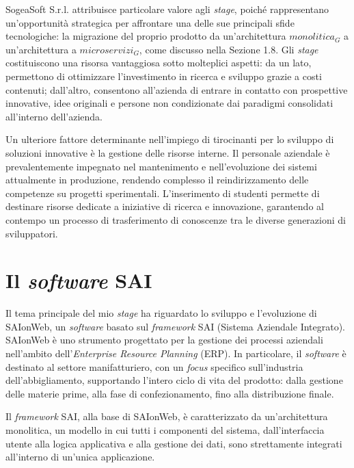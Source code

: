     \vspace{0.2 em}
    \noindent SogeaSoft S.r.l. attribuisce particolare valore agli \textit{stage}, poiché rappresentano un'opportunità strategica per affrontare una delle sue principali sfide tecnologiche: la migrazione del proprio prodotto da un’architettura $monolitica_G$ a un’architettura a $microservizi_G$, come discusso nella Sezione 1.8. Gli \textit{stage} costituiscono una risorsa vantaggiosa sotto molteplici aspetti: da un lato, permettono di ottimizzare l’investimento in ricerca e sviluppo grazie a costi contenuti; dall’altro, consentono all’azienda di entrare in contatto con prospettive innovative, idee originali e persone non condizionate dai paradigmi consolidati all'interno dell’azienda.  

    \vspace{0.2 em}
    \noindent Un ulteriore fattore determinante nell’impiego di tirocinanti per lo sviluppo di soluzioni innovative è la gestione delle risorse interne. Il personale aziendale è prevalentemente impegnato nel mantenimento e nell’evoluzione dei sistemi attualmente in produzione, rendendo complesso il reindirizzamento delle competenze su progetti sperimentali. L’inserimento di studenti permette di destinare risorse dedicate a iniziative di ricerca e innovazione, garantendo al contempo un processo di trasferimento di conoscenze tra le diverse generazioni di sviluppatori.
    
    \section{Il \textit{software} SAI}
    
    Il tema principale del mio \textit{stage} ha riguardato lo sviluppo e l’evoluzione di SAIonWeb, un \textit{software} basato sul \textit{framework} SAI (Sistema Aziendale Integrato). SAIonWeb è uno strumento progettato per la gestione dei processi aziendali nell’ambito dell’\textit{Enterprise Resource Planning} (ERP). In particolare, il \textit{software} è destinato al settore manifatturiero, con un \textit{focus} specifico sull'industria dell’abbigliamento, supportando l'intero ciclo di vita del prodotto: dalla gestione delle materie prime, alla fase di confezionamento, fino alla distribuzione finale.  

    \vspace{0.2 em}
    \noindent Il \textit{framework} SAI, alla base di SAIonWeb, è caratterizzato da un'architettura monolitica, un modello in cui tutti i componenti del sistema, dall’interfaccia utente alla logica applicativa e alla gestione dei dati, sono strettamente integrati all’interno di un'unica applicazione.  

